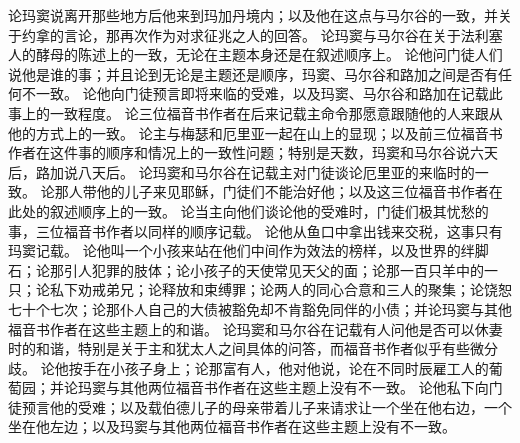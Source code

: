 论玛窦说离开那些地方后他来到玛加丹境内；以及他在这点与马尔谷的一致，并关于约拿的言论，那再次作为对求征兆之人的回答。\newline{} 论玛窦与马尔谷在关于法利塞人的酵母的陈述上的一致，无论在主题本身还是在叙述顺序上。\newline{} 论他问门徒人们说他是谁的事；并且论到无论是主题还是顺序，玛窦、马尔谷和路加之间是否有任何不一致。\newline{} 论他向门徒预言即将来临的受难，以及玛窦、马尔谷和路加在记载此事上的一致程度。\newline{} 论三位福音书作者在后来记载主命令那愿意跟随他的人来跟从他的方式上的一致。\newline{} 论主与梅瑟和厄里亚一起在山上的显现；以及前三位福音书作者在这件事的顺序和情况上的一致性问题；特别是天数，玛窦和马尔谷说六天后，路加说八天后。\newline{} 论玛窦和马尔谷在记载主对门徒谈论厄里亚的来临时的一致。\newline{} 论那人带他的儿子来见耶稣，门徒们不能治好他；以及这三位福音书作者在此处的叙述顺序上的一致。\newline{} 论当主向他们谈论他的受难时，门徒们极其忧愁的事，三位福音书作者以同样的顺序记载。\newline{} 论他从鱼口中拿出钱来交税，这事只有玛窦记载。\newline{} 论他叫一个小孩来站在他们中间作为效法的榜样，以及世界的绊脚石；论那引人犯罪的肢体；论小孩子的天使常见天父的面；论那一百只羊中的一只；论私下劝戒弟兄；论释放和束缚罪；论两人的同心合意和三人的聚集；论饶恕七十个七次；论那仆人自己的大债被豁免却不肯豁免同伴的小债；并论玛窦与其他福音书作者在这些主题上的和谐。\newline{} 论玛窦和马尔谷在记载有人问他是否可以休妻时的和谐，特别是关于主和犹太人之间具体的问答，而福音书作者似乎有些微分歧。\newline{} 论他按手在小孩子身上；论那富有人，他对他说，论在不同时辰雇工人的葡萄园；并论玛窦与其他两位福音书作者在这些主题上没有不一致。\newline{} 论他私下向门徒预言他的受难；以及载伯德儿子的母亲带着儿子来请求让一个坐在他右边，一个坐在他左边；以及玛窦与其他两位福音书作者在这些主题上没有不一致。\newline{} 